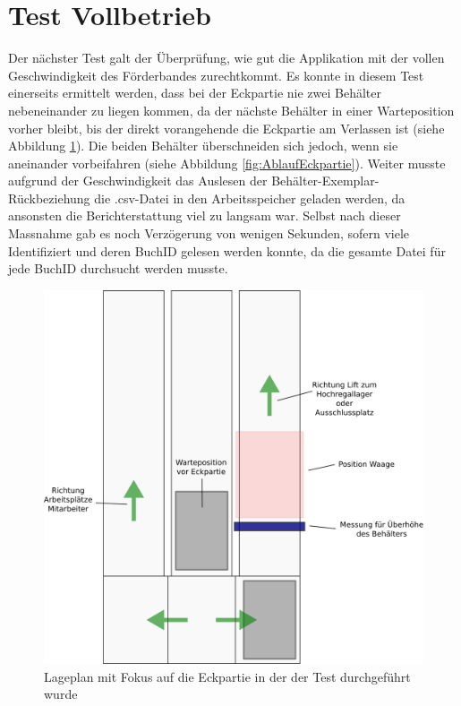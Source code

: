 \documentclass[parskip=full, a4paper]{scrartcl}
\begin{document}
\section{Test Vollbetrieb}
Der nächster Test galt der Überprüfung, wie gut die Applikation mit der vollen Geschwindigkeit des Förderbandes zurechtkommt. Es konnte in diesem Test einerseits ermittelt werden, dass bei der Eckpartie nie zwei Behälter nebeneinander zu liegen kommen, da der nächste Behälter in einer Warteposition vorher bleibt, bis der direkt vorangehende die Eckpartie am Verlassen ist (siehe Abbildung \ref{fig:PlanEckpartie}). Die beiden Behälter überschneiden sich jedoch, wenn sie aneinander vorbeifahren (siehe Abbildung \ref{fig:AblaufEckpartie}). Weiter musste aufgrund der Geschwindigkeit das Auslesen der Behälter-Exemplar-Rückbeziehung die .csv-Datei in den Arbeitsspeicher geladen werden, da ansonsten die Berichterstattung viel zu langsam war. Selbst nach dieser Massnahme gab es noch Verzögerung von wenigen Sekunden, sofern viele Identifiziert und deren BuchID gelesen werden konnte, da die gesamte Datei für jede BuchID durchsucht werden musste.

\begin{figure}[htb]
	\centering
	\includegraphics[keepaspectratio,width=0.6\linewidth]{img/PlanEckpartie.png}
	\caption{Lageplan mit Fokus auf die Eckpartie in der der Test durchgeführt wurde}
	\label{fig:PlanEckpartie}
\end{figure}
\end{document}
